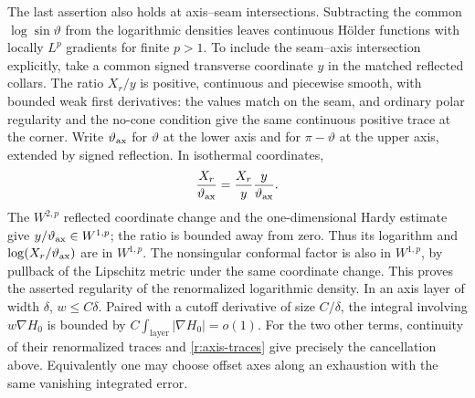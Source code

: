 The last assertion also holds at axis--seam intersections.  Subtracting
the common $\log\sin\vartheta$ from the logarithmic densities leaves
continuous H\"older functions with locally $L^p$ gradients for finite
$p>1$.  To include the seam--axis intersection explicitly, take a common
signed transverse coordinate $y$ in the matched reflected collars.
The ratio $X_r/y$ is positive, continuous and piecewise smooth, with
bounded weak first derivatives: the values match on the seam, and
ordinary polar regularity and the no-cone condition give the same
continuous positive trace at the corner.  Write $\vartheta_{\rm ax}$
for $\vartheta$ at the lower axis and for $\pi-\vartheta$ at the upper
axis, extended by signed reflection.  In isothermal coordinates,
\[
 \frac{X_r}{\vartheta_{\rm ax}}
      =\frac{X_r}{y}\frac{y}{\vartheta_{\rm ax}}.
\]
The $W^{2,p}$ reflected coordinate change and the one-dimensional Hardy
estimate give $y/\vartheta_{\rm ax}\in W^{1,p}$; the ratio is bounded away from
zero.  Thus its logarithm and $\log(X_r/\vartheta_{\rm ax})$ are in $W^{1,p}$.
The nonsingular conformal factor is also in $W^{1,p}$, by pullback of
the Lipschitz metric under the same coordinate change.  This proves
the asserted regularity of the renormalized logarithmic density.
In an axis layer of
width $\delta$, $w\le C\delta$.  Paired with a cutoff derivative of size
$C/\delta$, the integral involving $w\nabla H_0$ is bounded by
$C\int_{\text{layer}}|\nabla H_0|=o(1)$.  For the two other terms,
continuity of their renormalized traces and \eqref{r:axis-traces}
give precisely the cancellation above.  Equivalently one may choose
offset axes along an exhaustion with the same vanishing integrated error.

